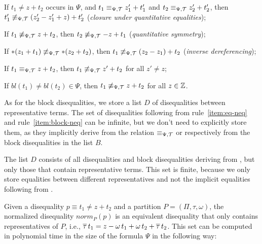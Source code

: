 \begin{enumerate}[label={[D\arabic*]}, ref={[D\arabic*]}]
    \setcounter{enumi}{-1} %
    \item\label{item:neq-quantitative-equalities}
    If $t_1 \neq z + t_2$ occurs in $\Psi$, and $t_1 \equiv_{\Psi,\mathcal{T}} z'_1 + t'_1$ and $t_2\equiv_{\Psi,\mathcal{T}} z'_2+t'_2$,
    then $t'_1\not\equiv_{\Psi,\mathcal{T}} (z'_2-z'_1+z)+t'_2$ (\emph{closure under quantitative equalities});
    \item\label{item:neq-quantitative-symmetry} If $t_1 \not\equiv_{\Psi,\mathcal{T}} z + t_2$, then $t_2 \not\equiv_{\Psi,\mathcal{T}} -z + t_1$ (\emph{quantitative symmetry});
          \item\label{item:inverse-deref}
          If $*(z_1 + t_1) \not\equiv_{\Psi,\mathcal{T}} *(z_2 + t_2)$, then $t_1 \not\equiv_{\Psi,\mathcal{T}} (z_2 - z_1) + t_2$
          (\emph{inverse dereferencing});
          \item\label{item:eq-neq} If $t_1 \equiv_{\Psi,\mathcal{T}} z + t_2$, then $t_1\not\equiv_{\Psi,\mathcal{T}} z'+t_2$ for all $z'\neq z$;
          \item\label{item:block-neq} If $bl(t_1) \neq bl(t_2) \in \Psi$, then $t_1 \not\equiv_{\Psi,\mathcal{T}} z + t_2$ for all $z \in \mathbb{Z}$.
\end{enumerate}

As for the block disequalities, we store a list $D$ of disequalities between representative terms.
The set of disequalities following from rule~\ref{item:eq-neq} and rule~\ref{item:block-neq} can be infinite, but we don't need to explicitly store them, as they implicitly derive from the relation $\equiv_{\Psi,\mathcal{T}}$ or respectively from the block disequalities in the list $B$.

The list $D$ consists of all disequalities and block disequalities deriving from
,
but only those that contain representative terms.
This set is finite, because we only store equalities between different representatives and not the implicit equalities following from .

Given a disequality $p \equiv t_1 \neq z + t_2$ and a partition $P = (\Pi, \tau, \omega)$,
the normalized disequality $norm_P(p)$ is an equivalent disequality that only contains representatives of $P$,
i.e., $\overline{\tau}\,t_1 = z - \omega\,t_1 + \omega\,t_2 + \overline{\tau}\,t_2$.
This set can be computed in polynomial time in the size of the formula $\Psi$ in the following way:

